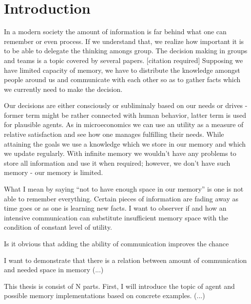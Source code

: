 \chapter{Introduction}

In a modern society the amount of information is far behind what one can remember or even process. If we understand that, we realize how important it is to be able to delegate the thinking amongs group. The decision making in groups and teams is a topic covered by several papers. [citation required] Supposing we have limited capacity of memory, we have to distribute the knowledge amongst people around us and communicate with each other so as to gather facts which we currently need to make the decision. 

Our decisions are either consciously or subliminaly based on our needs or drives - former term might be rather connected with human behavior, latter term is used for plausible agents. As in microeconomics we can use an utility as a measure of relative satisfaction \cite{Varian:micro} and see how one manages fulfilling their needs. While attaining the goals we use a knowledge which we store in our memory and which we update regularly. With infinite memory we wouldn’t have any problems to store all information and use it when required; however, we don’t have such memory - our memory is limited. 

What I mean by saying “not to have enough space in our memory” is one is not able to remember everything. Certain pieces of information are fading away as time goes or as one is learning new facts. I want to observer if and how an intensive communication can substitute insufficient memory space with the condition of constant level of utility.

Is it obvious that adding the ability of communication improves the chance

I want to demonstrate that there is a relation between amount of communication and needed space in memory (...)

This thesis is consist of N parts. First, I will introduce the topic of agent and possible memory implementations based on concrete examples. (...)